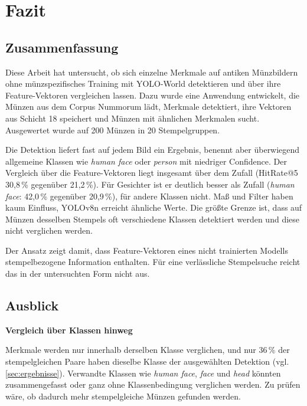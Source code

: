 
\chapter{Fazit}\label{ch:fazit}
\glsresetall %

\section{Zusammenfassung}
\label{sec:zusammenfassung}
Diese Arbeit hat untersucht, ob sich einzelne Merkmale auf antiken Münzbildern ohne münzspezifisches Training mit YOLO-World detektieren und über ihre Feature-Vektoren vergleichen lassen. Dazu wurde eine Anwendung entwickelt, die Münzen aus dem Corpus Nummorum lädt, Merkmale detektiert, ihre Vektoren aus Schicht 18 speichert und Münzen mit ähnlichen Merkmalen sucht. Ausgewertet wurde auf 200 Münzen in 20 Stempelgruppen.
 
Die Detektion liefert fast auf jedem Bild ein Ergebnis, benennt aber überwiegend allgemeine Klassen wie \textit{human face} oder \textit{person} mit niedriger Confidence. Der Vergleich über die Feature-Vektoren liegt insgesamt über dem Zufall (HitRate@5 30,8\,\% gegenüber 21,2\,\%). Für Gesichter ist er deutlich besser als Zufall (\textit{human face}: 42,0\,\% gegenüber 20,9\,\%), für andere Klassen nicht. Maß und Filter haben kaum Einfluss, YOLOv8n erreicht ähnliche Werte. Die größte Grenze ist, dass auf Münzen desselben Stempels oft verschiedene Klassen detektiert werden und diese nicht verglichen werden.
 
Der Ansatz zeigt damit, dass Feature-Vektoren eines nicht trainierten Modells stempelbezogene Information enthalten. Für eine verlässliche Stempelsuche reicht das in der untersuchten Form nicht aus.


\section{Ausblick}
\label{sec:ausblick}
\noindent \textbf{Vergleich über Klassen hinweg}
 
\noindent Merkmale werden nur innerhalb derselben Klasse verglichen, und nur 36\,\% der stempelgleichen Paare haben dieselbe Klasse der ausgewählten Detektion (vgl. \cref{sec:ergebnisse}). Verwandte Klassen wie \textit{human face}, \textit{face} und \textit{head} könnten zusammengefasst oder ganz ohne Klassenbedingung verglichen werden. Zu prüfen wäre, ob dadurch mehr stempelgleiche Münzen gefunden werden.
 
